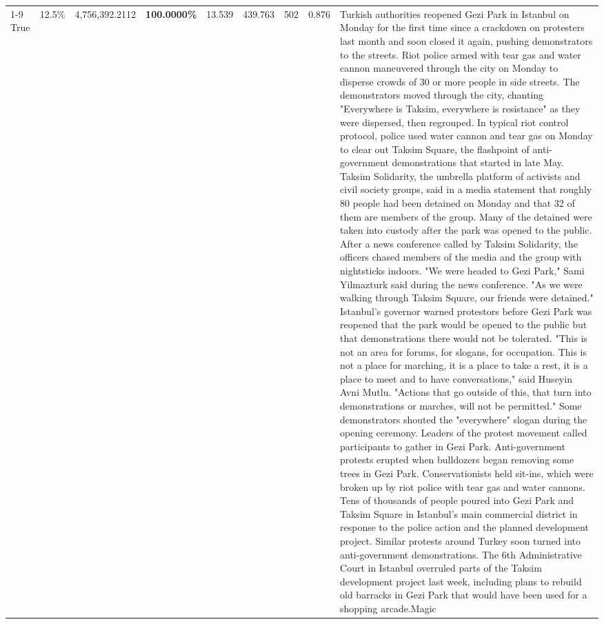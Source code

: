 \begin{table}[H]
\begin{tabular}{lllrlllll}
\cline{1-9}
True & 12.5\% & 4,756,392.2112 & \bfseries \color{red} 100.0000\% & 13.539 & 439.763 & 502 & 0.876 & Turkish authorities reopened Gezi Park in Istanbul on Monday for the first time since a crackdown on protesters last month and soon closed it again, pushing demonstrators to the streets. Riot police armed with tear gas and water cannon maneuvered through the city on Monday to disperse crowds of 30 or more people in side streets. The demonstrators moved through the city, chanting "Everywhere is Taksim, everywhere is resistance" as they were dispersed, then regrouped. In typical riot control protocol, police used water cannon and tear gas on Monday to clear out Taksim Square, the flashpoint of anti-government demonstrations that started in late May. Taksim Solidarity, the umbrella platform of activists and civil society groups, said in a media statement that roughly 80 people had been detained on Monday and that 32 of them are members of the group. Many of the detained were taken into custody after the park was opened to the public. After a news conference called by Taksim Solidarity, the officers chased members of the media and the group with nightsticks indoors. "We were headed to Gezi Park," Sami Yilmazturk said during the news conference. "As we were walking through Taksim Square, our friends were detained." Istanbul's governor warned protestors before Gezi Park was reopened that the park would be opened to the public but that demonstrations there would not be tolerated. "This is not an area for forums, for slogans, for occupation. This is not a place for marching, it is a place to take a rest, it is a place to meet and to have conversations," said Huseyin Avni Mutlu. "Actions that go outside of this, that turn into demonstrations or marches, will not be permitted." Some demonstrators shouted the "everywhere" slogan during the opening ceremony. Leaders of the protest movement called participants to gather in Gezi Park. Anti-government protests erupted when bulldozers began removing some trees in Gezi Park. Conservationists held sit-ins, which were broken up by riot police with tear gas and water cannons. Tens of thousands of people poured into Gezi Park and Taksim Square in Istanbul's main commercial district in response to the police action and the planned development project. Similar protests around Turkey soon turned into anti-government demonstrations. The 6th Administrative Court in Istanbul overruled parts of the Taksim development project last week, including plans to rebuild old barracks in Gezi Park that would have been used for a shopping arcade.Magic \\

\end{tabular}
\end{table}
